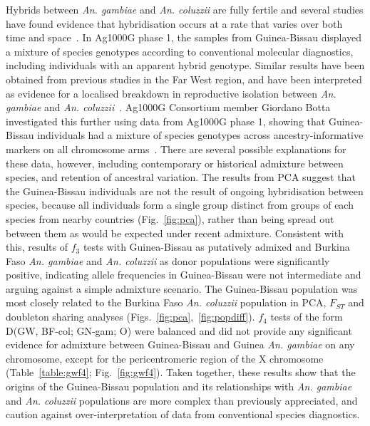 \begin{refsection}
Hybrids between \textit{An. gambiae} and \textit{An. coluzzii} are fully fertile and several studies have found evidence that hybridisation occurs at a rate that varies over both time and space~\parencite{Lee2013,Weetman2012}.
%
In Ag1000G phase 1, the samples from Guinea-Bissau displayed a mixture of species genotypes according to conventional molecular diagnostics, including individuals with an apparent hybrid genotype.
%
Similar results have been obtained from previous studies in the Far West region, and have been interpreted as evidence for a localised breakdown in reproductive isolation between \textit{An. gambiae} and \textit{An. coluzzii}~\parencite{Oliveira2008,Marsden2011,Weetman2012,Gordicho2014,Vicente2017}.
%
Ag1000G Consortium member Giordano Botta investigated this further using data from Ag1000G phase 1, showing that Guinea-Bissau individuals had a mixture of species genotypes across ancestry-informative markers on all chromosome arms~\parencite{Ag1000G2017}.
%
There are several possible explanations for these data, however, including contemporary or historical admixture between species, and retention of ancestral variation.
%
The results from PCA suggest that the Guinea-Bissau individuals are not the result of ongoing hybridisation between species, because all individuals form a single group distinct from groups of each species from nearby countries (Fig.~\ref{fig:pca}), rather than being spread out between them as would be expected under recent admixture.
%
Consistent with this, results of $f_3$ tests with Guinea-Bissau as putatively admixed and Burkina Faso \textit{An. gambiae} and \textit{An. coluzzii} as donor populations were significantly positive, indicating allele frequencies in Guinea-Bissau were not intermediate and arguing against a simple admixture scenario.
%
The Guinea-Bissau population was most closely related to the Burkina Faso \textit{An. coluzzii} population in PCA, $F_{ST}$ and doubleton sharing analyses (Figs.~\ref{fig:pca},~\ref{fig:popdiff}).
%
$f_4$ tests of the form D(GW, BF-col; GN-gam; O) were balanced and did not provide any significant evidence for admixture between Guinea-Bissau and Guinea \textit{An. gambiae} on any chromosome, except for the pericentromeric region of the X chromosome (Table~\ref{table:gwf4}; Fig.~\ref{fig:gwf4}).
%
Taken together, these results show that the origins of the Guinea-Bissau population and its relationships with \textit{An. gambiae} and \textit{An. coluzzii} populations are more complex than previously appreciated, and caution against over-interpretation of data from conventional species diagnostics.



\end{refsection}
